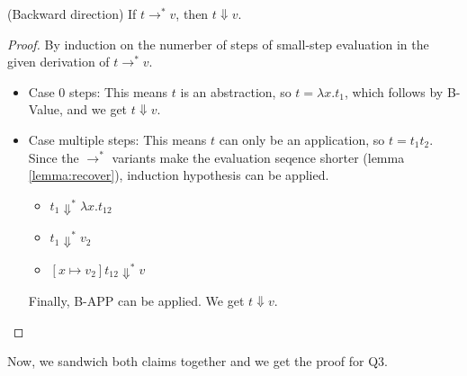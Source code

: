 \documentclass[12pt]{article}
\begin{document}
\begin{claim}
(Backward direction) If $t \rightarrow^* v$, then $t \Downarrow v$.
\end{claim}
\begin{proof}
By induction on the numerber of steps of small-step evaluation in the given derivation of $t \rightarrow^* v$.
\begin{itemize}
\item
Case 0 steps:
This means $t$ is an abstraction, so $t = \lambda x . t_1$, which follows by B-Value, and we get $t \Downarrow v$.
\item
Case multiple steps:
This means $t$ can only be an application, so $t = t_1t_2$.
Since the $\rightarrow^*$ variants make the evaluation seqence shorter (lemma \ref{lemma:recover}), induction hypothesis can be applied.
\begin{itemize}
\item
$t_1 \Downarrow^* \lambda x . t_{12}$
\item
$t_1 \Downarrow^* v_2$
\item
$[x \mapsto v_2] t_{12} \Downarrow^* v$
\end{itemize}
Finally, B-APP can be applied.
We get $t \Downarrow v$.
\end{itemize}
\end{proof}
Now, we sandwich both claims together and we get the proof for Q3.
\done
\end{document}
